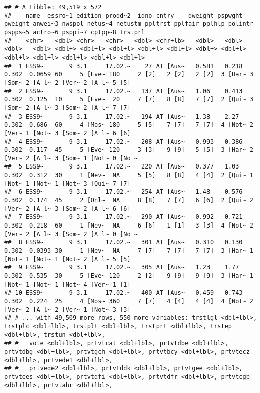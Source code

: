 \documentclass[
]{book}
\begin{document}
\begin{verbatim}
## # A tibble: 49,519 x 572
##    name  essro~1 edition prodd~2  idno cntry    dweight pspwght pweight anwei~3 nwspol netus~4 netustm ppltrst pplfair pplhlp polintr pspps~5 actro~6 psppi~7 cptpp~8 trstprl
##    <chr>   <dbl> <chr>   <chr>   <dbl> <chr+lb>   <dbl>   <dbl>   <dbl>   <dbl> <dbl+> <dbl+l> <dbl+l> <dbl+l> <dbl+l> <dbl+> <dbl+l> <dbl+l> <dbl+l> <dbl+l> <dbl+l> <dbl+l>
##  1 ESS9~       9 3.1     17.02.~    27 AT [Aus~   0.581   0.218   0.302  0.0659 60     5 [Eve~ 180     2 [2]   2 [2]   2 [2]  3 [Har~ 3 [Som~ 2 [A l~ 2 [Ver~ 2 [A l~ 5 [5]  
##  2 ESS9~       9 3.1     17.02.~   137 AT [Aus~   1.06    0.413   0.302  0.125  10     5 [Eve~  20     7 [7]   8 [8]   7 [7]  2 [Qui~ 3 [Som~ 2 [A l~ 3 [Som~ 2 [A l~ 7 [7]  
##  3 ESS9~       9 3.1     17.02.~   194 AT [Aus~   1.38    2.27    0.302  0.686  60     4 [Mos~ 180     5 [5]   7 [7]   7 [7]  4 [Not~ 2 [Ver~ 1 [Not~ 3 [Som~ 2 [A l~ 6 [6]  
##  4 ESS9~       9 3.1     17.02.~   208 AT [Aus~   0.993   0.386   0.302  0.117  45     5 [Eve~ 120     3 [3]   9 [9]   5 [5]  3 [Har~ 2 [Ver~ 2 [A l~ 3 [Som~ 1 [Not~ 0 [No ~
##  5 ESS9~       9 3.1     17.02.~   220 AT [Aus~   0.377   1.03    0.302  0.312  30     1 [Nev~  NA     5 [5]   8 [8]   4 [4]  2 [Qui~ 1 [Not~ 1 [Not~ 1 [Not~ 3 [Qui~ 7 [7]  
##  6 ESS9~       9 3.1     17.02.~   254 AT [Aus~   1.48    0.576   0.302  0.174  45     2 [Onl~  NA     8 [8]   7 [7]   6 [6]  2 [Qui~ 2 [Ver~ 2 [A l~ 3 [Som~ 2 [A l~ 6 [6]  
##  7 ESS9~       9 3.1     17.02.~   290 AT [Aus~   0.992   0.721   0.302  0.218  60     1 [Nev~  NA     6 [6]   1 [1]   3 [3]  4 [Not~ 2 [Ver~ 2 [A l~ 3 [Som~ 2 [A l~ 0 [No ~
##  8 ESS9~       9 3.1     17.02.~   301 AT [Aus~   0.310   0.130   0.302  0.0393 30     1 [Nev~  NA     7 [7]   7 [7]   7 [7]  3 [Har~ 1 [Not~ 1 [Not~ 1 [Not~ 2 [A l~ 5 [5]  
##  9 ESS9~       9 3.1     17.02.~   305 AT [Aus~   1.23    1.77    0.302  0.535  30     5 [Eve~ 120     2 [2]   9 [9]   9 [9]  3 [Har~ 1 [Not~ 1 [Not~ 1 [Not~ 4 [Ver~ 1 [1]  
## 10 ESS9~       9 3.1     17.02.~   400 AT [Aus~   0.459   0.743   0.302  0.224  25     4 [Mos~ 360     7 [7]   4 [4]   4 [4]  4 [Not~ 2 [Ver~ 2 [A l~ 2 [Ver~ 1 [Not~ 3 [3]  
## # ... with 49,509 more rows, 550 more variables: trstlgl <dbl+lbl>, trstplc <dbl+lbl>, trstplt <dbl+lbl>, trstprt <dbl+lbl>, trstep <dbl+lbl>, trstun <dbl+lbl>,
## #   vote <dbl+lbl>, prtvtcat <dbl+lbl>, prtvtdbe <dbl+lbl>, prtvtdbg <dbl+lbl>, prtvtgch <dbl+lbl>, prtvtbcy <dbl+lbl>, prtvtecz <dbl+lbl>, prtvede1 <dbl+lbl>,
## #   prtvede2 <dbl+lbl>, prtvtddk <dbl+lbl>, prtvtgee <dbl+lbl>, prtvtees <dbl+lbl>, prtvtdfi <dbl+lbl>, prtvtdfr <dbl+lbl>, prtvtcgb <dbl+lbl>, prtvtahr <dbl+lbl>,

\end{verbatim}
\end{document}
